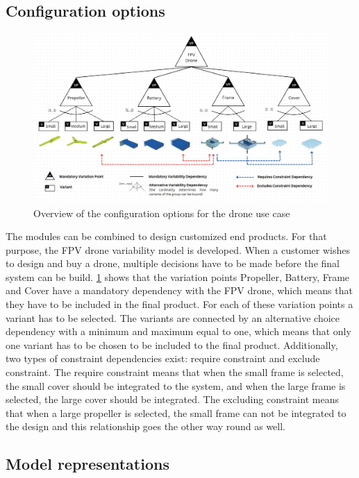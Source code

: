 \documentclass[sigconf,review]{acmart}
\begin{document}
\subsection{Configuration options}
\label{sec:configuration-options}

\begin{figure}[htbp]
    \includegraphics[width=\textwidth]{./FeatureTreeWithLegend3.jpg}
    \caption{Overview of the configuration options for the drone use case}
    \label{fig:feature-tree}
\end{figure}

The modules can be combined to design customized end products.  
For that purpose, the FPV drone variability model is developed. 
When a customer wishes to design and buy a drone, multiple decisions have to be made before the final system can be build. 
\cref{fig:feature-tree} shows that the variation points Propeller, Battery, Frame and Cover have a mandatory dependency with the FPV drone, which means that they have to be included in the final product. 
For each of these variation points a variant has to be selected. 
The variants are connected by an alternative choice dependency with a minimum and maximum equal to one, which means that only one variant has to be chosen to be included to the final product. 
Additionally, two types of constraint dependencies exist: require constraint and exclude constraint. 
The require constraint means that when the small frame is selected, the small cover should be integrated to the system, and when the large frame is selected, the large cover should be integrated. 
The excluding constraint means that when a large propeller is selected, the small frame can not be integrated to the design and this relationship goes the other way round as well.

\subsection{Model representations}
\label{sec:150-model}
\end{document}
